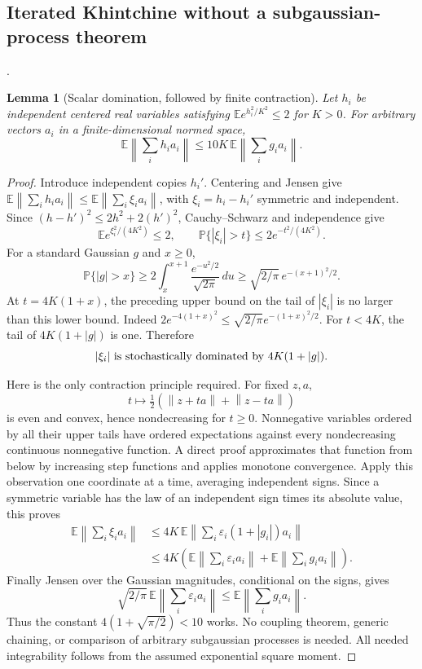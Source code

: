 \documentclass[11pt,a4paper]{article}
\newcommand{\norm}[1]{\left\lVert#1\right\rVert}
\DeclareRobustCommand{\code}[1]{{\footnotesize\urlstyle{tt}\nolinkurl{#1}}}
\newtheorem{lemma}[theorem]{Lemma}
\begin{document}
\subsection{Iterated Khintchine without a subgaussian-process theorem}
\label{route:matrix-chaos-iterated-khintchine}
\noindent\code{matrix-chaos-iterated-khintchine}.

\begin{lemma}[Scalar domination, followed by finite contraction]
\label{lem:subgaussian-gaussian-domination}
Let $h_i$ be independent centered real variables satisfying
$\mathbb E e^{h_i^2/K^2}\leq2$ for $K>0$.  For arbitrary vectors $a_i$
in a finite-dimensional normed space,
\[
          \mathbb E\left\|\sum_i h_i a_i\right\|
        \leq 10K\,\mathbb E\left\|\sum_i g_i a_i\right\|.
\]
\end{lemma}
\begin{proof}
Introduce independent copies $h_i'$.  Centering and Jensen give
$\mathbb E\norm{\sum_i h_i a_i}
 \leq\mathbb E\norm{\sum_i\xi_i a_i}$, with
$\xi_i=h_i-h_i'$ symmetric and independent.  Since
$(h-h')^2\leq2h^2+2(h')^2$, Cauchy--Schwarz and independence give
\[
 \mathbb E e^{\xi_i^2/(4K^2)}\leq2,
 \qquad \mathbb P\{|\xi_i|>t\}\leq2e^{-t^2/(4K^2)}.
\]
For a standard Gaussian $g$ and $x\geq0$,
\[
 \mathbb P\{|g|>x\}
 \geq2\int_x^{x+1}\frac{e^{-u^2/2}}{\sqrt{2\pi}}\,du
 \geq\sqrt{2/\pi}\,e^{-(x+1)^2/2}.
\]
At $t=4K(1+x)$, the preceding upper bound on the tail of $|\xi_i|$
is no larger than this lower bound.  Indeed
$2e^{-4(1+x)^2}\leq\sqrt{2/\pi}e^{-(1+x)^2/2}$.
For $t<4K$, the tail of $4K(1+|g|)$ is one.  Therefore
\[
                  |\xi_i|\ \hbox{is stochastically dominated by}
                     \ 4K(1+|g|).
\]

Here is the only contraction principle required.  For fixed $z,a$,
\[
        t\longmapsto\tfrac12(\norm{z+ta}+\norm{z-ta})
\]
is even and convex, hence nondecreasing for $t\geq0$.  Nonnegative
variables ordered by all their upper tails have ordered expectations
against every nondecreasing continuous nonnegative function.  A direct
proof approximates that function from below by increasing step
functions and applies monotone convergence.  Apply this observation
one coordinate at a time, averaging independent signs.  Since a
symmetric variable has the law of an independent sign times its
absolute value, this proves
\begin{align*}
 \mathbb E\norm{\sum_i\xi_i a_i}
 &\leq4K\,\mathbb E\norm{\sum_i\varepsilon_i(1+|g_i|)a_i}\\
 &\leq4K\left(\mathbb E\norm{\sum_i\varepsilon_i a_i}
                  +\mathbb E\norm{\sum_i g_i a_i}\right).
\end{align*}
Finally Jensen over the Gaussian magnitudes, conditional on the signs,
gives
\[
 \sqrt{2/\pi}\,\mathbb E\norm{\sum_i\varepsilon_i a_i}
       \leq\mathbb E\norm{\sum_i g_i a_i}.
\]
Thus the constant $4(1+\sqrt{\pi/2})<10$ works.  No coupling theorem,
generic chaining, or comparison of arbitrary subgaussian processes is
needed.  All needed integrability follows from the assumed exponential
square moment.
\end{proof}
\end{document}
